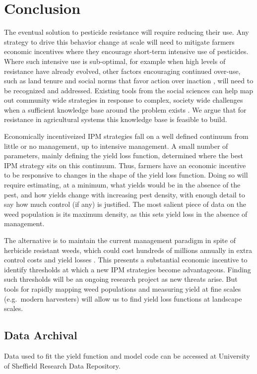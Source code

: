 \documentclass[9pt,twocolumn,twoside,lineno]{pnas-new}
\begin{document}
\section*{Conclusion}
The eventual solution to pesticide resistance will require reducing their use. Any strategy to drive this behavior change at scale will need to mitigate farmers economic incentives where they encourage short-term intensive use of pesticides. Where such intensive use is sub-optimal, for example when high levels of resistance have already evolved, other factors encouraging continued over-use, such as land tenure \citep{Fras2004} and social norms that favor action over inaction \citep{Wils2008}, will need to be recognized and addressed. Existing tools from the social sciences can help map out community wide strategies in response to complex, society wide challenges when a sufficient knowledge base around the problem exists \citep{Barn2014}. We argue that for resistance in agricultural systems this knowledge base is feasible to build. 

Economically incentiveized IPM strategies fall on a well defined continuum from little or no management, up to intensive management. A small number of parameters, mainly defining the yield loss function, determined where the best IPM strategy sits on this continuum. Thus, farmers have an economic incentive to be responsive to changes in the shape of the yield loss function. Doing so will require estimating, at a minimum, what yields would be in the absence of the pest, and how yields change with increasing pest density, with enough detail to say how much control (if any) is justified. The most salient piece of data on the weed population is its maximum density, as this sets yield loss in the absence of management. 
  
The alternative is to maintain the current management paradigm in spite of herbicide resistant weeds, which could cost hundreds of millions annually in extra control costs and yield losses \citep{Hick2018}. This presents a substantial economic incentive to identify thresholds at which a new IPM strategies become advantageous. Finding such thresholds will be an ongoing research project as new threats arise. But tools for rapidly mapping weed populations \citep{Quee2011, Lamb2018} and measuring yield at fine scales (e.g.\ modern harvesters) will allow us to find yield loss functions at landscape scales. 

\subsection*{Data Archival}
Data used to fit the yield function and model code can be accessed at University of Sheffield Research Data Repository.
\end{document}
